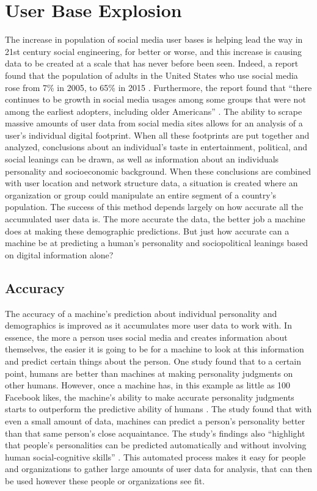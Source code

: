 \documentclass[sigconf]{acmart}
\begin{document}
\section{User Base Explosion}

The increase in population of social media user bases is helping lead the way in 21st century social engineering, for better or worse, and this increase is causing data to be created at a scale that has never before been seen. Indeed, a report found that the population of adults in the United States who use social media rose from 7\% in 2005, to 65\% in 2015 \cite{Perrin2015}. Furthermore, the report found that ``there continues to be growth in social media usages among some groups that were not among the earliest adopters, including older Americans'' \cite{Perrin2015}. The ability to scrape massive amounts of user data from social media sites allows for an analysis of a user's individual digital footprint. When all these footprints are put together and analyzed, conclusions about an individual's taste in entertainment, political, and social leanings can be drawn, as well as information about an individuals personality and socioeconomic background. When these conclusions are combined with user location and network structure data, a situation is created where an organization or group could manipulate an entire segment of a country's population.  The success of this method depends largely on how accurate all the accumulated user data is. The more accurate the data, the better job a machine does at making these demographic predictions. But just how accurate can a machine be at predicting a human's personality and sociopolitical leanings based on digital information alone?


\subsection{Accuracy}

The accuracy of a machine's prediction about individual personality and demographics is improved as it accumulates more user data to work with. In essence, the more a person uses social media and creates information about themselves, the easier it is going to be for a machine to look at this information and predict certain things about the person. One study found that to a certain point, humans are better than machines at making personality judgments on other humans. However, once a machine has, in this example as little as 100 Facebook likes, the machine's ability to make accurate personality judgments starts to outperform the predictive ability of humans \cite{Youyou2015}. The study found that with even a small amount of data, machines can predict a person's personality better than that same person's close acquaintance. The study's findings also ``highlight that people's personalities can be predicted automatically and without involving human social-cognitive skills'' \cite{Youyou2015}. This automated process makes it easy for people and organizations to gather large amounts of user data for analysis, that can then be used however these people or organizations see fit.
\end{document}
